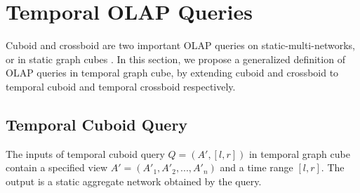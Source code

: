 \documentclass[10pt,journal,compsoc]{IEEEtran}
\begin{document}
\section{Temporal OLAP Queries}  \label{sec:queries}
Cuboid and crossboid are two important OLAP queries on static-multi-networks, or in static graph cubes \cite{zhao2011graph}. In this section, we propose a generalized definition of OLAP queries in temporal graph cube, by extending cuboid and crossboid to temporal cuboid and temporal crossboid respectively. %

\subsection{Temporal Cuboid Query} \label{subsec:cuboid}
The inputs of temporal cuboid query $ Q=(A',[l,r]) $ in temporal graph cube contain a specified view $A'=(A'_1,A'_2,...,A'_n)$ and a time range $[l,r]$. The output is a static aggregate network obtained by the query. %
\end{document}
